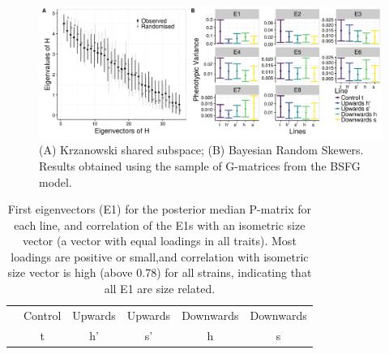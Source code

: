\begin{refsection}
\begin{figure}
\centering
\includegraphics[width = \linewidth]{chapter_ratones/media/SI/figureS8_Fig2Gversion.png}
\caption{(A) Krzanowski shared subspace; (B) Bayesian Random Skewers. Results obtained using the sample of G-matrices from the BSFG model.}
\end{figure}

\begin{table}
    \centering
    \caption{First eigenvectors (E1) for the posterior median P-matrix for each line, and correlation of the E1s with an isometric size vector (a vector with equal loadings in all traits). Most loadings are positive or small,and correlation with isometric size vector is high (above 0.78) for all strains, indicating that all E1 are size related.}
    \begin{tabular}{rccccc}
        \hline
      & Control & Upwards  & Upwards & Downwards & Downwards  \\
                & t & h' &  s' &  h &  s \\


\end{tabular}
\end{table}
\end{refsection}
